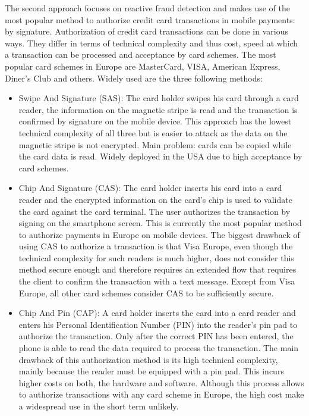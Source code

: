 \documentclass[a4paper, oneside]{csthesis}
\begin{document}
The second approach focuses on reactive fraud detection and makes use of the most popular method to authorize credit card transactions in mobile payments: by signature.
Authorization of credit card transactions can be done in various ways. They differ in terms of technical complexity and thus cost, speed at which a transaction can be processed and acceptance by card schemes. The most popular card schemes in Europe are MasterCard, VISA, American Express, Diner's Club and others. Widely used are the three following methods:

\begin{itemize}
\item Swipe And Signature (SAS): The card holder swipes his card through a card reader, the information on the magnetic stripe is read and the transaction is confirmed by signature on the mobile device. This approach has the lowest technical complexity of all three but is easier to attack as the data on the magnetic stripe is not encrypted. Main problem: cards can be copied while the card data is read. Widely deployed in the USA due to high acceptance by card schemes.
\item Chip And Signature (CAS): The card holder inserts his card into a card reader and the encrypted information on the card's chip is used to validate the card against the card terminal. The user authorizes the transaction by signing on the smartphone screen. This is currently the most popular method to authorize payments in Europe on mobile devices. The biggest drawback of using CAS to authorize a transaction is that Visa Europe, even though the technical complexity for such readers is much higher, does not consider this method secure enough and therefore requires an extended flow that requires the client to confirm the transaction with a text message. Except from Visa Europe, all other card schemes consider CAS to be sufficiently secure.
\item Chip And Pin (CAP): A card holder inserts the card into a card reader and enters his Personal Identification Number (PIN) into the reader's pin pad to authorize the transaction. Only after the correct PIN has been entered, the phone is able to read  the data required to process the transaction. The main drawback of this authorization method is its high technical complexity, mainly because the reader must be equipped with a pin pad. This incurs higher costs on both, the hardware and software. Although this process allows to authorize transactions with any card scheme in Europe, the high cost make a widespread use in the short term unlikely.
\end{itemize}
\end{document}
